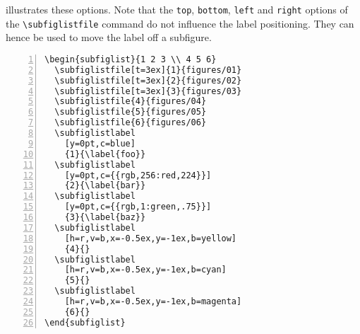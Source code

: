 \documentclass[version=3.12,american]{scrartcl}
\begin{document}
 illustrates these options. Note that the \texttt{top}, \texttt{bottom}, \texttt{left} and \texttt{right} options of the \verb|\subfiglistfile| command do not influence the label positioning. They can hence be used to move the label off a subfigure.

\begin{listing}
\begin{minipage}{0.4\textwidth}
\begin{Verbatim}[numbers=left]
\begin{subfiglist}{1 2 3 \\ 4 5 6}
  \subfiglistfile[t=3ex]{1}{figures/01}
  \subfiglistfile[t=3ex]{2}{figures/02}
  \subfiglistfile[t=3ex]{3}{figures/03}
  \subfiglistfile{4}{figures/04}
  \subfiglistfile{5}{figures/05}
  \subfiglistfile{6}{figures/06}
  \subfiglistlabel
    [y=0pt,c=blue]
    {1}{\label{foo}}
  \subfiglistlabel
    [y=0pt,c={{rgb,256:red,224}}]
    {2}{\label{bar}}
  \subfiglistlabel
    [y=0pt,c={{rgb,1:green,.75}}]
    {3}{\label{baz}}
  \subfiglistlabel
    [h=r,v=b,x=-0.5ex,y=-1ex,b=yellow]
    {4}{}
  \subfiglistlabel
    [h=r,v=b,x=-0.5ex,y=-1ex,b=cyan]
    {5}{}
  \subfiglistlabel
    [h=r,v=b,x=-0.5ex,y=-1ex,b=magenta]
    {6}{}
\end{subfiglist}
\end{Verbatim}
\end{minipage}
\hfill
{}
\caption{Demonstration of the different options for the \texttt{\textbackslash subfiglistlabel} command}
\label{lst:labels}
\end{listing}
\end{document}
